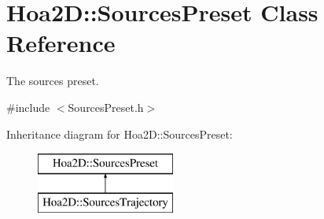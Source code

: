 \hypertarget{class_hoa2_d_1_1_sources_preset}{\section{Hoa2\-D\-:\-:Sources\-Preset Class Reference}
\label{class_hoa2_d_1_1_sources_preset}
}


The sources preset.  




{\ttfamily \#include $<$Sources\-Preset.\-h$>$}

Inheritance diagram for Hoa2\-D\-:\-:Sources\-Preset\-:\begin{figure}[H]
\begin{center}
\leavevmode
\includegraphics[height=2.000000cm]{class_hoa2_d_1_1_sources_preset}
\end{center}
\end{figure}
